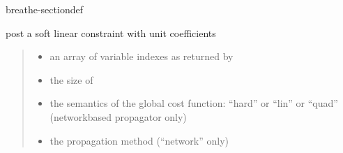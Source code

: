 \documentclass[letterpaper,10pt,openany,oneside,english]{sphinxmanual}
\begin{document}
\begin{fulllineitems}
\begin{sphinxuseclass}{breathe-sectiondef}
\begin{fulllineitems}
\label{\detokenize{ref/ref_cpp:_CPPv4N11WeightedCSP8postWSumEPii6string4Cost6stringi}}\label{\detokenize{ref/ref_cpp:_CPPv3N11WeightedCSP8postWSumEPii6string4Cost6stringi}}\label{\detokenize{ref/ref_cpp:_CPPv2N11WeightedCSP8postWSumEPii6string4Cost6stringi}}\label{\detokenize{ref/ref_cpp:WeightedCSP::postWSum__iP.i.string.Cost.string.i}}
\pysigstartsignatures
\pysigstartmultiline
{}
\pysigstopmultiline
\pysigstopsignatures
\sphinxAtStartPar
post a soft linear constraint with unit coefficients 
\begin{quote}\begin{description}
\begin{itemize}
\item {} 
\sphinxAtStartPar
{} \textendash{} an array of variable indexes as returned by {\hyperref[\detokenize{ref/ref_cpp:classWeightedCSP_1a2329c94c60817153e45de627c79f8281}]{}} 

\item {} 
\sphinxAtStartPar
{} \textendash{} the size of  

\item {} 
\sphinxAtStartPar
{} \textendash{} the semantics of the global cost function: “hard” or “lin” or “quad” (network\sphinxhyphen{}based propagator only) 

\item {} 
\sphinxAtStartPar
{} \textendash{} the propagation method (“network” only) 


\end{itemize}
\end{description}
\end{quote}
\end{fulllineitems}
\end{sphinxuseclass}
\end{fulllineitems}
\end{document}
